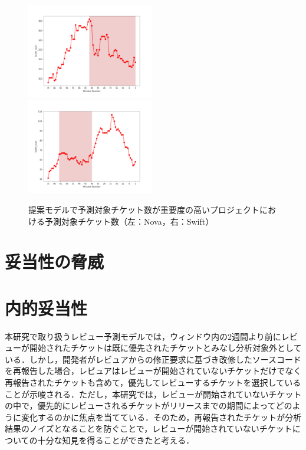 \documentclass[submit]{ipsj}
\begin{document}
\begin{figure}[t]
\begin{center}
    \includegraphics[width=0.495\textwidth]{Uenaka_fig/RQ2_kousatu/Nova_ticket_num.pdf}
    \includegraphics[width=0.495\textwidth]{Uenaka_fig/RQ2_kousatu/Swift_ticket_num_merge.pdf}
    \caption{提案モデルで予測対象チケット数が重要度の高いプロジェクトにおける予測対象チケット数（左：Nova，右：Swift）}
    \label{fig:merge_ticket_num}
\end{center}
\end{figure}


\section{妥当性の脅威}\label{sec:disc}

\section{内的妥当性}
本研究で取り扱うレビュー予測モデルでは，ウィンドウ内の2週間より前にレビューが開始されたチケットは既に優先されたチケットとみなし分析対象外としている．しかし，開発者がレビュアからの修正要求に基づき改修したソースコードを再報告した場合，レビュアはレビューが開始されていないチケットだけでなく再報告されたチケットも含めて，優先してレビューするチケットを選択していることが示唆される．ただし，本研究では，レビューが開始されていないチケットの中で，優先的にレビューされるチケットがリリースまでの期間によってどのように変化するのかに焦点を当てている．そのため，再報告されたチケットが分析結果のノイズとなることを防ぐことで，レビューが開始されていないチケットについての十分な知見を得ることができたと考える．
\end{document}
